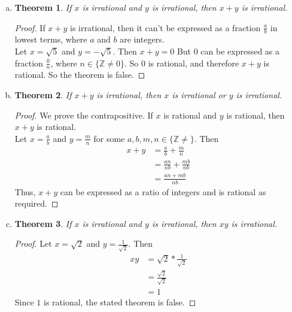 \documentclass[12pt]{scrartcl} %
\newtheorem*{theorem}{Theorem}
\begin{document}
\begin{enumerate}[(a)]
\item \begin{theorem}
	If $x$ is irrational and $y$ is irrational, then $x + y$ is irrational.
	\end{theorem}
	
    	\begin{proof}
	If $x + y$ is irrational, then it can't be expressed as a fraction $\frac{a}{b}$ in lowest terms, where $a$ and $b$ are integers.\\
	Let $x = \sqrt{5}$ and $y = - \sqrt{5}$. Then $x + y = 0$ But $0$ can be expressed as a fraction $\frac{0}{n}$, where $n \in \{\mathbb{Z} \neq 0\}$. So $0$ is rational, and therefore $x + y$ is rational. So the theorem is false.
	\end{proof}
	
\item \begin{theorem}
If $x + y$ is irrational, then $x$ is irrational or $y$ is irrational.
\end{theorem}
\begin{proof}
We prove the contrapositive. If $x$ is rational and $y$ is rational, then $x + y$ is rational.\\
Let $x = \frac{a}{b}$ and $y = \frac{m}{n}$ for some $a, b, m, n \in \{\mathbb{Z} \neq\}$. Then \begin{align}
x + y &= \frac{a}{b} + \frac{m}{n} \\
&= \frac{an}{nb} + \frac{mb}{nb} \\
&= \frac{an + mb}{nb}
\end{align}
Thus, $x+y$ can be expressed as a ratio of integers and is rational as required.
\end{proof}
\item \begin{theorem}
If $x$ is irrational and $y$ is irrational, then $xy$ is irrational.
\end{theorem}
\begin{proof}
Let $x=\sqrt{2}$ and $y=\frac{1}{\sqrt{2}}$. Then \begin{align}
xy &= \sqrt{2} * \frac{1}{\sqrt{2}}\\
&= \frac{\sqrt{2}}{\sqrt{2}}\\
&= 1
\end{align}
Since $1$ is rational, the stated theorem is false.
\end{proof}
\end{enumerate}
\end{document}
